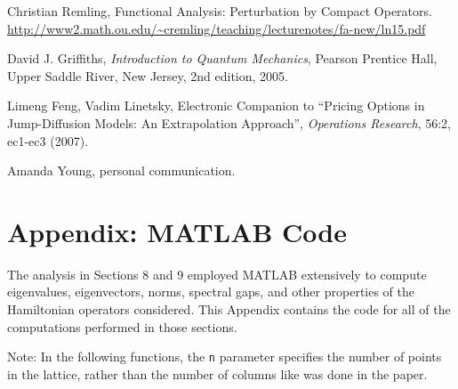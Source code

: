 \documentclass{article}
\numberwithin{equation}{section}
\numberwithin{theorem}{section}
\numberwithin{proposition}{section}
\numberwithin{lemma}{section}
\numberwithin{corollary}{section}
\numberwithin{definition}{section}
\begin{document}

\begin{thebibliography}{1}

  Christian Remling, Functional Analysis: Perturbation by Compact Operators.  \url{http://www2.math.ou.edu/~cremling/teaching/lecturenotes/fa-new/ln15.pdf}
  
  David J. Griffiths, 
  \emph{Introduction to Quantum Mechanics},
  Pearson Prentice Hall, Upper Saddle River, New Jersey,
  2nd edition,
  2005.

  Limeng Feng, Vadim Linetsky, Electronic Companion to ``Pricing Options in Jump-Diffusion Models: An Extrapolation Approach'', 
  \emph{Operations Research},
  56:2, ec1-ec3 (2007).

  Amanda Young, personal communication.
\end{thebibliography}

\section*{Appendix: MATLAB Code}

The analysis in Sections 8 and 9 employed MATLAB extensively to compute eigenvalues, eigenvectors, norms, spectral gaps, and other properties of the Hamiltonian operators considered. This Appendix contains the code for all of the computations performed in those sections.

Note: In the following functions, the \texttt{n} parameter specifies the number of points in the lattice, rather than the number of columns like was done in the paper.















\end{document}
